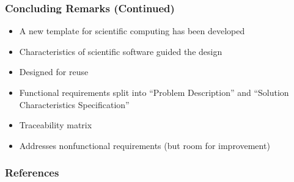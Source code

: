 \documentclass[t,12pt,numbers,fleqn]{beamer}
\begin{document}

\begin{frame}
\frametitle{Concluding Remarks (Continued)}
\begin{itemize}
\item A new template for scientific computing has been developed
\item Characteristics of scientific software guided the design
\item Designed for reuse
\item Functional requirements split into ``Problem Description'' and ``Solution Characteristics Specification''
\item Traceability matrix
\item Addresses nonfunctional requirements (but room for improvement)
\end{itemize}

\end{frame}


\begin{frame}[allowframebreaks]
\frametitle{References}

\nocite{Lai2004, SmithEtAl2004, SmithAndLai2005, IEEE1998, IEEE2000,
  IEEE2000_ThayerAndDorfman, RobertsonAndRobertson1999Vol, DesharnaisEtAl2004,
  JanickiAndKhedri2001, GhezziEtAl2003, KreymanAndParnas2002,
  ParnasAndClements1986, Segal2007_Dagsthul, Segal2008, Segal2007, Segal2005, Dubois2002}



\end{frame}

\end{document}
